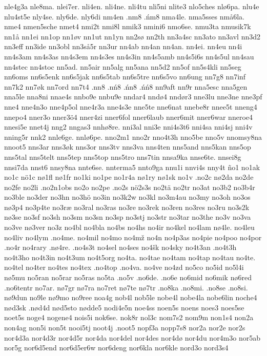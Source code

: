 {{nle4g3a
nle8ma.
nlei7er.
nli4en.
nli4ne.
nli4tu
nli5ni
nlite3
nlo5ches
nlø6pa.
nlu4e
nlu4st5e
nly4se.
nly6de.
nly6di
nm4en
.nm8
.ńm8
nma4le.
nma5sses
nmå6la.
nme4
nmen5sche
nmet4
nmi2t
nmi8l
nmik3
nmini6
nmo6se.
nmu3ta
nmusik7k
nn1å
nn1ei
nn1op
nn1øv
nn1ut
nn1yn
nn2sø
nn2th
nn3a4sc
nn3ato
nn3avl
nn3d2
nn3eff
nn3ide
nn3obl
nn3så5r
nn3ur
nn4ab
nn4an
nn4an.
nn4ei.
nn4eu
nn4i
nn4s3am
nn4s3as
nn4s3em
nn4s3es
nn4s3in
nn4s5amb
nn4s5i6s
nn4s5ul
nn4sau
nn4stec
nn4stoc
nn5ad.
nn5air
nn5alg
nn5ana
nn5d2
nn5of
nn5s4kli
nn5seg
nn6oms
nn6s5enk
nn6s5jak
nn6s5tab
nn6s5tre
nn6s5vo
nn6ung
nn7g8
nn7inf
nn7k2
nn7øk
nn7ord
nn7t4
.nn8
.nń8
.ńn8
.ńń8
nn9aft
nn9r
nna5esc
nna5gen
nna5le
nna8ni
nnae4s
nnbo9e
nnbu9e
nndar4
nndø4
nndør3
nne3lu
nne3ne
nne3pf
nne4
nne4n3o
nne4p5ol
nne4r3a
nne4s3e
nne5te
nne6nat
nnebe8r
nnee5t
nneng4
nnepo4
nner3o
nner3ö4
nner4zi
nner6fol
nner6laub
nner6mit
nner6war
nneroe4
nnesi5e
nnet4j
nng2
nngas3
nnhø8re.
nni3al
nni3e
nni4s3t6
nni4sa
nni4sj
nni4v
nning5r
nnk2
nnle6ge.
nnlø6pe.
nno2m1
nno2r
nno4t3h
nno5be
nno5v
nnomsy8na
nnoot5
nns3ar
nns3øk
nns3or
nns3tv
nns3va
nns4ten
nns5and
nns5kan
nns5op
nns5tal
nns5telt
nns5tep
nns5top
nns5tro
nns7tin
nnsa9ka
nnse6te.
nnsei8g
nnsi7da
nnst6
nnsy8na
nnte6se.
nnterma5
nnto9ga
nnu1i
nnvi4s
nny4t
ño1
no1ak
no1c
nö1c
nø1fl
nø1fr
no1ki
no1pe
no1r4a
nø1ry
nø1sk
no1v
.no2c
nø2da
no2de
no2fe
no2li
.no2n1obs
no2o
no2pe
.no2s
nö2s3s
no2tä
no2tr
no3at
no3b2
no3b4r
no3ble
no3der
no3hn
no3hö
no3in
no3k2w
no3kl
no3m4au
no3my
no3oh
no3os
nø3p4
no3p4te
no3ræ
no3ral
no3ras
no3re
no3rek
no3ren
no3res
no3ru
no3s2k
nø3se
no3sf
no3sh
no3sm
no3sn
no3sp
no3stj
no3str
no3tar
no3the
no3v
no3va
no3ve
nø3ver
no3z
no4bl
no4bla
no4bs
no4hs
no4ir
no4kel
no4lam
nø4le.
no4leu
no4liv
no4lym
.no4me.
no4mil
no4mo
no4mž
no4n
no4p3as
no4pie
no4poo
no4por
.no4r
no4rary
.nø4re.
.no4s3t
no4sel
no4ses
no4šk
no4sky
no4t3an
.no4t3h
no4t3ho
no4t3in
no4t3um
no4t5org
no4ta.
no4tae
no4tam
no4tap
no4tau
no4te.
no4tel
no4ter
no4tes
no4tex
.no4top
.no4va.
no4ve
no4zd
no5co
no5id
no5l4i
nø5mu
no5ran
no5rar
no5ras
no5ta
.no5v
.no6de.
.no6e
no6mid
no6mik
nø6red
.no6tentr
no7ar.
nø7gr
nø7ra
no7ret
nø7te
nø7tr
.no8ka
.no8mi.
.no8se
.no8si.
nø9dun
no9le
nø9mo
no9ree
noa4g
nob4l
nob5le
nobe4l
nobe4la
nobe6lin
noche4
nød3sk
.nød4d
nød5sto
nødde5
nodi4e5n
noe4ss
noen5s
noens
noes3
noes5se
noet5s
noge4
nogene4
nois5i
nok6se.
nok8r
nol3c
nom7s2
nom9m
non1s4
non2a
non4ag
non5i
non5t
nooi5tj
noot4j
.noot5
nopf3a
nopp7s8
nor2a
nor2e
nor2s
nor4d3a
nor4d3r
nor4d5r
nor4da
nor4del
nor4des
nor4dø
nor4du
nor4m3o
nor5ab
nor5g
nor6d5end
nor6d5er6w
nor6deng
nor6kla
nor6kle
nord3o
nord3s4
}}
